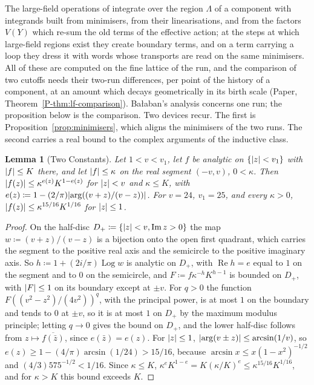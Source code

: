 \documentclass[11pt]{preprint}
\DeclarePairedDelimiter{\abs}{\lvert}{\rvert}
\numberwithin{equation}{section}
\newtheorem{lemma}{Lemma}[section]
\theoremstyle{definition}
\theoremstyle{remark}
\theoremstyle{plain}
\begin{document}
The large-field operations of \cite[\S1]{BalabanLFR2} integrate over the region $\Lambda$ of a component with integrands built from minimisers, from their linearisations, and from the factors $V(Y)$ which re-sum the old terms of the effective action; at the steps at which large-field regions exist they create boundary terms, and on a term carrying a loop they dress it with words whose transports are read on the same minimisers. All of these are computed on the fine lattice of the run, and the comparison of two cutoffs needs their two-run differences, per point of the history of a component, at an amount which decays geometrically in its birth scale (Paper, Theorem~\ref{P-thm:lf-comparison}). Ba{\l}aban's analysis concerns one run; the proposition below is the comparison. Two devices recur. The first is Proposition~\ref{prop:minimisers}, which aligns the minimisers of the two runs. The second carries a real bound to the complex arguments of the inductive class.

\begin{lemma}[Two Constants]\label{lem:two-constants}
Let $1 < v < v_1$, let $f$ be analytic on $\{\abs z < v_1\}$ with $\abs f \leq K$ there, and let $\abs f \leq \kappa$ on the real segment $(-v, v)$, $0 < \kappa$. Then $\abs{f(z)} \leq \kappa^{e(z)}K^{1-e(z)}$ for $\abs z < v$ and $\kappa \leq K$, with $e(z) \coloneqq 1 - (2/\pi)\abs{\arg((v + z)/(v - z))}$. For $v = 24$, $v_1 = 25$, and every $\kappa > 0$, $\abs{f(z)} \leq \kappa^{15/16}K^{1/16}$ for $\abs z \leq 1$.
\end{lemma}

\begin{proof}
On the half-disc $D_+ \coloneqq \{\abs z < v, \operatorname{Im}z > 0\}$ the map $w \coloneqq (v + z)/(v - z)$ is a bijection onto the open first quadrant, which carries the segment to the positive real axis and the semicircle to the positive imaginary axis. So $h \coloneqq 1 + (2i/\pi)\operatorname{Log}w$ is analytic on $D_+$, with $\operatorname{Re}h = e$ equal to $1$ on the segment and to $0$ on the semicircle, and $F \coloneqq f\kappa^{-h}K^{h-1}$ is bounded on $D_+$, with $\abs F \leq 1$ on its boundary except at $\pm v$. For $q > 0$ the function $F((v^2 - z^2)/(4v^2))^q$, with the principal power, is at most $1$ on the boundary and tends to $0$ at $\pm v$, so it is at most $1$ on $D_+$ by the maximum modulus principle; letting $q \to 0$ gives the bound on $D_+$, and the lower half-disc follows from $z \mapsto \overline{f(\bar z)}$, since $e(\bar z) = e(z)$. For $\abs z \leq 1$, $\abs{\arg(v \pm z)} \leq \arcsin(1/v)$, so $e(z) \geq 1 - (4/\pi)\arcsin(1/24) > 15/16$, because $\arcsin x \leq x(1 - x^2)^{-1/2}$ and $(4/3)575^{-1/2} < 1/16$. Since $\kappa \leq K$, $\kappa^eK^{1-e} = K(\kappa/K)^e \leq \kappa^{15/16}K^{1/16}$, and for $\kappa > K$ this bound exceeds $K$.
\end{proof}
\end{document}

